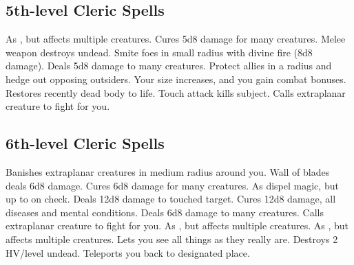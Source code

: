 \subsection{5th-level Cleric Spells}
\begin{spelllist}
   As , but affects multiple creatures.
   Cures 5d8 damage for many creatures.
   Melee weapon destroys undead.
   Smite foes in small radius with divine fire (8d8 damage).
   Deals 5d8 damage to many creatures.
   Protect allies in a \areamed radius and hedge out opposing outsiders.
   Your size increases, and you gain combat bonuses.
   Restores recently dead body to life.
   Touch attack kills subject.
   Calls extraplanar creature to fight for you.
\end{spelllist}

\subsection{6th-level Cleric Spells}
\begin{spelllist}
   Banishes extraplanar creatures in medium radius around you.
   Wall of blades deals 6d8 damage.
   Cures 6d8 damage for many creatures.
   As dispel magic, but up to  on check.
   Deals 12d8 damage to touched target.
   Cures 12d8 damage, all diseases and mental conditions.
   Deals 6d8 damage to many creatures.
   Calls extraplanar creature to fight for you.
   As , but affects multiple creatures.
   As , but affects multiple creatures.
  \M Lets you see all things as they really are.
  \M Destroys 2 HV/level undead.
   Teleports you back to designated place.
\end{spelllist}

